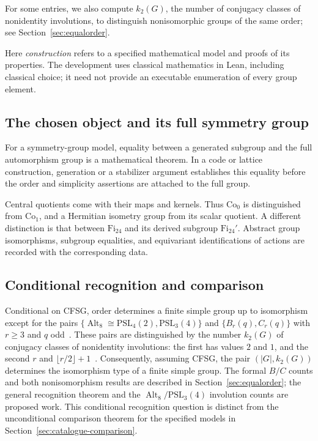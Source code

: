 \documentclass[11pt]{article}
\numberwithin{equation}{section}
\theoremstyle{definition}
\newcommand{\PSL}{\mathrm{PSL}}
\newcommand{\Alt}{\operatorname{Alt}}
\newcommand{\Co}{\mathrm{Co}}
\newcommand{\Fi}{\mathrm{Fi}}
\begin{document}
For some entries, we also compute $k_2(G)$, the number of conjugacy
classes of nonidentity involutions, to distinguish nonisomorphic groups
of the same order; see Section~\ref{sec:equalorder}.

Here \emph{construction} refers to a specified mathematical model and
proofs of its properties. The development uses classical mathematics in
Lean, including classical choice; it need not provide an executable
enumeration of every group element.

\subsection{The chosen object and its full symmetry group}

For a symmetry-group model, equality between a generated subgroup and
the full automorphism group is a mathematical theorem. In a code or
lattice construction, generation or a stabilizer argument establishes
this equality before the order and simplicity assertions are attached
to the full group.

Central quotients come with their maps and kernels. Thus $\Co_0$ is
distinguished from $\Co_1$, and a Hermitian isometry group from its
scalar quotient. A different distinction is that between $\Fi_{24}$
and its derived subgroup $\Fi_{24}'$. Abstract group isomorphisms,
subgroup equalities, and equivariant identifications of actions are
recorded with the corresponding data.

\subsection{Conditional recognition and comparison}

Conditional on CFSG, order determines a finite simple group up to
isomorphism except for the pairs
$\{\Alt_8\cong\PSL_4(2),\PSL_3(4)\}$ and
$\{B_r(q),C_r(q)\}$ with $r\geq3$ and $q$ odd~\cite{OrderRecognition}.
These pairs are distinguished by the number $k_2(G)$ of conjugacy
classes of nonidentity involutions: the first has values $2$ and $1$,
and the second $r$ and $\lfloor r/2\rfloor+1$~\cite{Taylor,BorovikInvolutions}.
Consequently, assuming CFSG, the pair $(|G|,k_2(G))$ determines the
isomorphism type of a finite simple group. The formal
$B/C$ counts and both nonisomorphism results are described in
Section~\ref{sec:equalorder}; the general recognition theorem and the
$\Alt_8/\PSL_3(4)$ involution counts are proposed work.
This conditional recognition question is distinct from the unconditional
comparison theorem for the specified models in
Section~\ref{sec:catalogue-comparison}.
\end{document}
